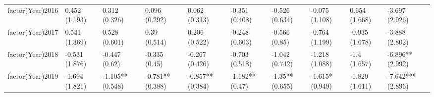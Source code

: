 \begin{table}[ht]
\begin{tabular}{llllllllll}
  factor(Year)2016 & 0.452 (1.193) & 0.312 (0.326) & 0.096 (0.292) & 0.062 (0.313) & -0.351 (0.408) & -0.526 (0.634) & -0.075 (1.108) & 0.654 (1.668) & -3.697 (2.926) \\ 
  factor(Year)2017 & 0.541 (1.369) & 0.528 (0.601) & 0.39 (0.514) & 0.206 (0.522) & -0.248 (0.603) & -0.566 (0.85) & -0.764 (1.199) & -0.935 (1.678) & -3.888 (2.802) \\ 
  factor(Year)2018 & -0.531 (1.876) & -0.447 (0.62) & -0.335 (0.45) & -0.267 (0.426) & -0.703 (0.518) & -1.042 (0.742) & -1.218 (1.088) & -1.4 (1.657) & -6.896** (2.992) \\ 
  factor(Year)2019 & -1.694 (1.821) & -1.105** (0.548) & -0.781** (0.388) & -0.857** (0.384) & -1.182** (0.47) & -1.35** (0.655) & -1.615* (0.949) & -1.829 (1.611) & -7.642*** (2.896) \\ 
   \bottomrule
\end{tabular}
\endgroup
\end{table}
